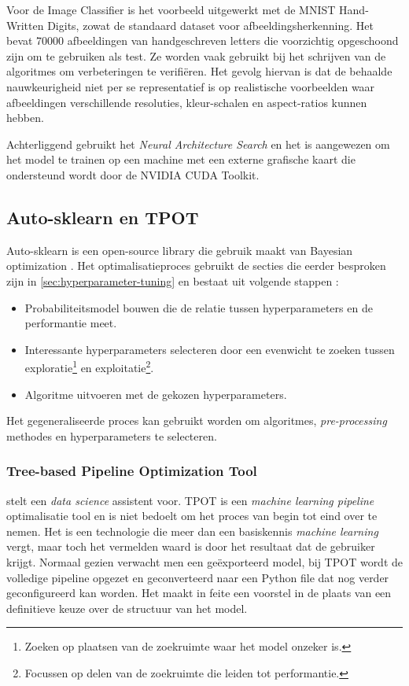 Voor de Image Classifier is het voorbeeld uitgewerkt met de MNIST Hand-Written Digits, zowat de standaard dataset voor afbeeldingsherkenning. Het bevat 70000 afbeeldingen van handgeschreven letters die voorzichtig opgeschoond zijn om te gebruiken als test. Ze worden vaak gebruikt bij het schrijven van de algoritmes om verbeteringen te verifiëren. Het gevolg hiervan is dat de behaalde nauwkeurigheid niet per se representatief is op realistische voorbeelden waar afbeeldingen verschillende resoluties, kleur-schalen en aspect-ratios kunnen hebben.

Achterliggend gebruikt het \textit{Neural Architecture Search} en het is aangewezen om het model te trainen op een machine met een externe grafische kaart die ondersteund wordt door de NVIDIA CUDA Toolkit.

\subsection{Auto-sklearn en TPOT}
\label{subsec:autosk}

Auto-sklearn is een open-source library die gebruik maakt van Bayesian optimization \autocite{Feurer2015}. Het optimalisatieproces gebruikt de secties die eerder besproken zijn in \ref{sec:hyperparameter-tuning} en bestaat uit volgende stappen \autocite{Feurer2016}: 

\begin{itemize}
    \item Probabiliteitsmodel bouwen die de relatie tussen hyperparameters en de performantie meet.
    \item Interessante hyperparameters selecteren door een evenwicht te zoeken tussen exploratie\footnote{Zoeken op plaatsen van de zoekruimte waar het model onzeker is.} en exploitatie\footnote{Focussen op delen van de zoekruimte die leiden tot performantie.}.
    \item Algoritme uitvoeren met de gekozen hyperparameters.
\end{itemize}

Het gegeneraliseerde proces kan gebruikt worden om algoritmes, \textit{pre-processing} methodes en hyperparameters te selecteren.

\subsubsection{Tree-based Pipeline Optimization Tool}

\textcite{Olson2016} stelt een \textit{data science} assistent voor. TPOT is een \textit{machine learning pipeline} optimalisatie tool en is niet bedoelt om het proces van begin tot eind over te nemen. Het is een technologie die meer dan een basiskennis \textit{machine learning} vergt, maar toch het vermelden waard is door het resultaat dat de gebruiker krijgt. Normaal gezien verwacht men een geëxporteerd model, bij TPOT wordt de volledige pipeline opgezet en geconverteerd naar een Python file dat nog verder geconfigureerd kan worden. Het maakt in feite een voorstel in de plaats van een definitieve keuze over de structuur van het model. 

